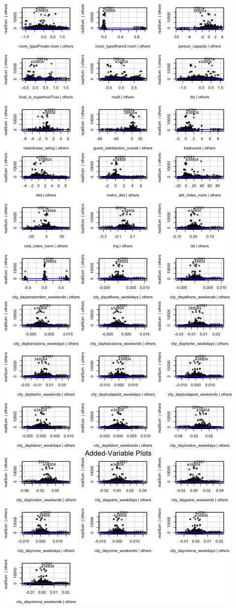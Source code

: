 \documentclass[
]{article}
\begin{document}
\includegraphics{Project_files/figure-latex/unnamed-chunk-48-2.png}
\includegraphics{Project_files/figure-latex/unnamed-chunk-48-3.png}
\includegraphics{Project_files/figure-latex/unnamed-chunk-48-4.png}
\includegraphics{Project_files/figure-latex/unnamed-chunk-48-5.png}
\end{document}
